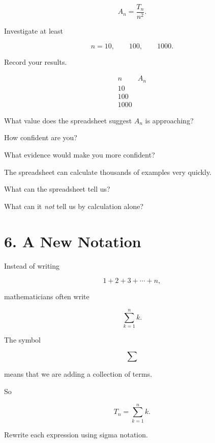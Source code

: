 \documentclass[11pt]{article}
\begin{document}
\[
A_n=\frac{T_n}{n^2}.
\]

Investigate at least

\[
n=10,\qquad
100,\qquad
1000.
\]

Record your results.

\[
\begin{array}{c|c}
n&A_n\\
\hline
10&\\[0.15in]
100&\\[0.15in]
1000&
\end{array}
\]


What value does the spreadsheet suggest \(A_n\) is approaching?

\vspace{0.35in}

How confident are you?

\vspace{0.35in}

What evidence would make you more confident?

\vspace{0.4in}


\begin{reflection}
The spreadsheet can calculate thousands of examples very quickly.

What can the spreadsheet tell us?

\vspace{0.25in}

What can it \emph{not} tell us by calculation alone?
\end{reflection}


\section{6. A New Notation}

Instead of writing

\[
1+2+3+\cdots+n,
\]

mathematicians often write

\[
\sum_{k=1}^{n} k.
\]

The symbol

\[
\sum
\]

means that we are adding a collection of terms.

So

\[
T_n
=
\sum_{k=1}^{n}k.
\]


Rewrite each expression using sigma notation.
\end{document}
